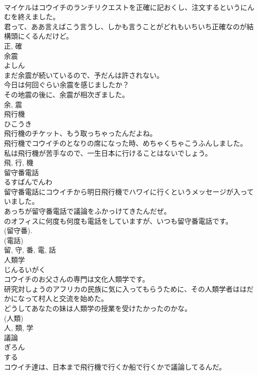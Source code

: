 \documentclass[8pt]{extreport}
\begin{document}
\begin{CJK}{UTF8}{min}
\\	マイケルはコウイチのランチリクエストを正確に記おくし、注文するというにんむを終えました。	
\\	君って、ああ言えばこう言うし、しかも言うことがどれもいちいち正確なのが結構頭にくるんだけど。	
\\	正, 確	
\\	余震	
\\	よしん	
\\	まだ余震が続いているので、予だんは許されない。	
\\	今日は何回ぐらい余震を感じましたか？	
\\	その地震の後に、余震が相次ぎました。	
\\	余, 震	
\\	飛行機	
\\	ひこうき	
\\	飛行機のチケット、もう取っちゃったんだよね。	
\\	飛行機でコウイチのとなりの席になった時、めちゃくちゃこうふんしました。	
\\	私は飛行機が苦手なので、一生日本に行けることはないでしょう。	
\\	飛, 行, 機	
\\	留守番電話	
\\	るすばんでんわ	
\\	留守番電話にコウイチから明日飛行機でハワイに行くというメッセージが入っていました。	
\\	あっちが留守番電話で議論をふかっけてきたんだぜ。	
\\	のオフィスに何度も何度も電話をしていますが、いつも留守番電話です。	
\\	(留守番). 
\\	(電話) 
\\	留, 守, 番, 電, 話	
\\	人類学	
\\	じんるいがく	
\\	コウイチのお父さんの専門は文化人類学です。	
\\	研究対しょうのアフリカの民族に気に入ってもらうために、その人類学者ははだかになって村人と交流を始めた。	
\\	どうしてあなたの妹は人類学の授業を受けたかったのかな。	
\\	(人類) 
\\	人, 類, 学	
\\	議論	
\\	ぎろん	
\\	する 
\\	コウイチ達は、日本まで飛行機で行くか船で行くかで議論してるんだ。	

\end{CJK}
\end{document}
